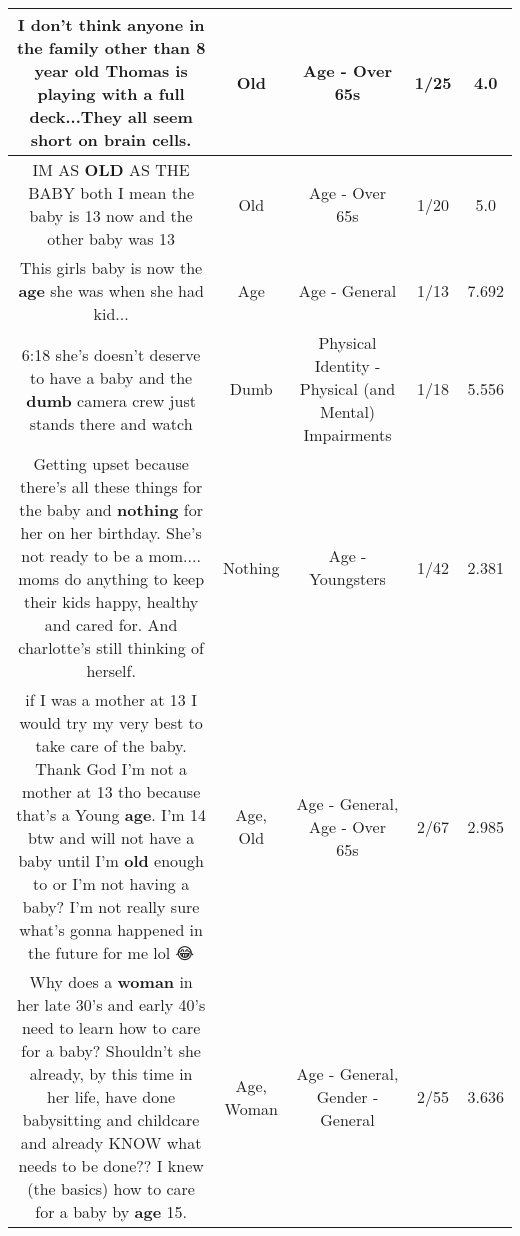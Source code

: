 \documentclass[11pt]{article}
\newlength\mylength
\begin{document}
\begin{center}
\begin{longtable}{|C{.65\mylength}|C{.30\mylength}|C{.12\mylength}|C{.12\mylength}|C{.12\mylength}|}
  \small I don't think anyone in the family other than 8 year \textbf{old} Thomas is playing with a full deck...They all seem short on brain cells.\normalsize   & Old & Age - Over 65s & 1/25 & 4.0 \\  \hline
  \small IM AS \textbf{OLD} AS THE BABY  both I mean the baby is 13 now and the other baby was 13\normalsize   & Old & Age - Over 65s & 1/20 & 5.0 \\  \hline
  \small This girls baby is now the \textbf{age} she was when she had kid...\normalsize   & Age & Age - General & 1/13 & 7.692 \\  \hline
  \small 6:18 she's doesn't deserve to have a baby and the \textbf{dumb} camera crew just stands there and watch\normalsize   & Dumb & Physical Identity - Physical (and Mental) Impairments & 1/18 & 5.556 \\  \hline
  \small Getting upset because there's all these things for the baby and \textbf{nothing} for her on her birthday. She's not ready to be a mom.... moms do anything to keep their kids happy, healthy and cared for. And charlotte's still thinking of herself.\normalsize   & Nothing & Age - Youngsters & 1/42 & 2.381 \\  \hline
  \small if I was a mother at 13 I would try my very best to take care of the baby. Thank God I'm not a mother at 13 tho because that's a Young \textbf{age}. I'm 14 btw and will not have a baby until I'm \textbf{old} enough to or I'm not having a baby? I'm not really sure what's gonna happened in the future for me lol 😂\normalsize   & Age, Old & Age - General, Age - Over 65s & 2/67 & 2.985 \\  \hline
  \small Why does a \textbf{woman} in her late 30's and early 40's need to learn how to care for a baby? Shouldn't she already, by this time in her life, have done babysitting and childcare and already KNOW what needs to be done?? I knew (the basics) how to care for a baby by \textbf{age} 15.\normalsize   & Age, Woman & Age - General, Gender - General & 2/55 & 3.636 \\  \hline

\end{longtable}
\end{center}
\end{document}
